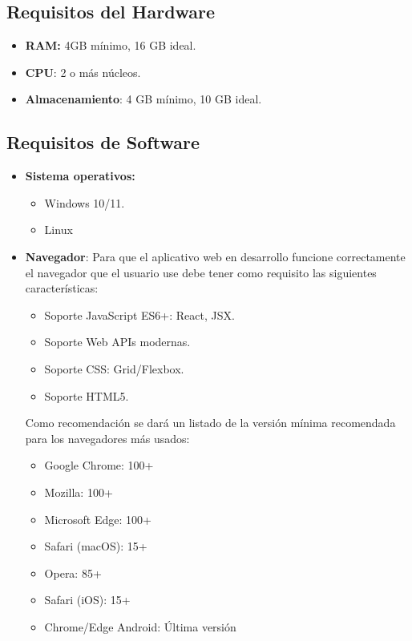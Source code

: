 \subsection{Requisitos del Hardware}
\begin{itemize}
    \item {\textbf{RAM:} 4GB mínimo, 16 GB ideal.}
    \item { \textbf{CPU}: 2 o más núcleos.}
    \item {\textbf{Almacenamiento}: 4 GB  mínimo, 10 GB ideal.}
\end{itemize}

\subsection{Requisitos de Software}
\begin{itemize}
    \item \textbf{Sistema operativos:}
        \begin{itemize}
            \item {Windows 10/11.}
            \item {Linux}
        \end{itemize}
    \item \textbf{Navegador}: Para que el aplicativo web en desarrollo funcione correctamente el navegador que el usuario use debe tener como requisito las siguientes características:
    \begin{itemize}
        \item {Soporte JavaScript ES6+: React, JSX.}
        \item {Soporte Web APIs modernas.}
        \item {Soporte CSS: Grid/Flexbox.}
        \item {Soporte HTML5.}
    \end{itemize}
    Como recomendación se dará un listado de la versión mínima recomendada para los navegadores más usados:
     \begin{itemize}
        \item {Google Chrome: 100+}
        \item Mozilla: 100+
        \item Microsoft Edge: 100+
        \item Safari (macOS): 15+
        \item Opera: 85+
        \item Safari (iOS): 15+
        \item Chrome/Edge Android: Última versión
    \end{itemize}

\end{itemize}
